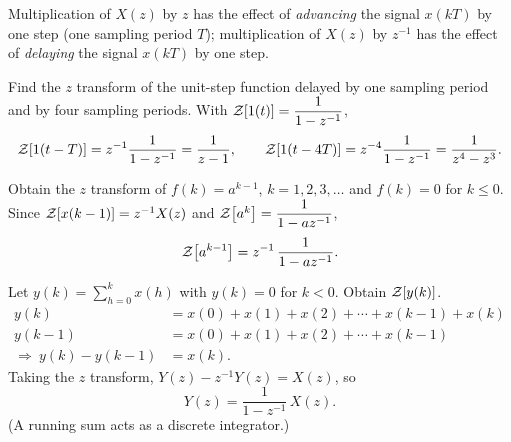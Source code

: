 \begin{remark}
Multiplication of $X(z)$ by $z$ has the effect of \emph{advancing} the signal $x(kT)$ by one step (one
sampling period $T$); multiplication of $X(z)$ by $z^{-1}$ has the effect of \emph{delaying} the signal $x(kT)$
by one step.
\end{remark}

\begin{example}
Find the $z$ transform of the unit-step function delayed by one sampling period and by four sampling periods.
With $\mathcal{Z}\!\left[1(t)\right]=\dfrac{1}{1-z^{-1}}$,
\[
  \mathcal{Z}\!\left[1(t-T)\right]=z^{-1}\frac{1}{1-z^{-1}}=\frac{1}{z-1},\qquad
  \mathcal{Z}\!\left[1(t-4T)\right]=z^{-4}\frac{1}{1-z^{-1}}=\frac{1}{z^{4}-z^{3}}.
\]
\begin{center}
\end{center}
\end{example}

\begin{example}
Obtain the $z$ transform of $f(k)=a^{k-1}$, $k=1,2,3,\dots$ and $f(k)=0$ for $k\le0$.
Since $\mathcal{Z}\!\left[x(k-1)\right]=z^{-1}X(z)$ and $\mathcal{Z}\!\left[a^{k}\right]=\dfrac{1}{1-az^{-1}}$,
\[
  \mathcal{Z}\!\left[a^{k-1}\right]=z^{-1}\,\frac{1}{1-az^{-1}}.
\]
\end{example}

\begin{example}
Let $y(k)=\sum_{h=0}^{k}x(h)$ with $y(k)=0$ for $k<0$. Obtain $\mathcal{Z}\!\left[y(k)\right]$.
\begin{align*}
  y(k)&=x(0)+x(1)+x(2)+\cdots+x(k-1)+x(k)\\
  y(k-1)&=x(0)+x(1)+x(2)+\cdots+x(k-1)\\
  \Rightarrow\ y(k)-y(k-1)&=x(k).
\end{align*}
Taking the $z$ transform, $Y(z)-z^{-1}Y(z)=X(z)$, so
\[
  Y(z)=\frac{1}{1-z^{-1}}\,X(z).
\]
(A running sum acts as a discrete integrator.)
\end{example}

